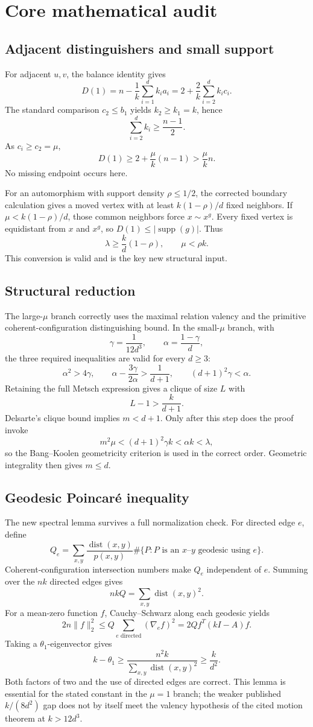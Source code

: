 \documentclass[11pt]{article}
\newcommand{\dist}{\operatorname{dist}}
\newcommand{\gam}{\gamma}
\begin{document}
\section{Core mathematical audit}
\subsection{Adjacent distinguishers and small support}
For adjacent $u,v$, the balance identity gives
\[
 D(1)=n-\frac1k\sum_{i=1}^d k_i a_i
     =2+\frac2k\sum_{i=2}^d k_i c_i.
\]
The standard comparison $c_2\le b_1$ yields $k_2\ge k_1=k$, hence
\[
 \sum_{i=2}^d k_i\ge\frac{n-1}{2}.
\]
As $c_i\ge c_2=\mu$,
\[
 D(1)\ge2+\frac{\mu}{k}(n-1)>\frac{\mu}{k}n.
\]
No missing endpoint occurs here.

For an automorphism with support density $\rho\le1/2$, the corrected boundary calculation gives a moved vertex with at least $k(1-\rho)/d$ fixed neighbors.  If $\mu<k(1-\rho)/d$, those common neighbors force $x\sim x^g$.  Every fixed vertex is equidistant from $x$ and $x^g$, so $D(1)\le|\operatorname{supp}(g)|$.  Thus
\[
 \lambda\ge\frac{k}{d}(1-\rho),
 \qquad
 \mu<\rho k.
\]
This conversion is valid and is the key new structural input.

\subsection{Structural reduction}
The large-$\mu$ branch correctly uses the maximal relation valency and the primitive coherent-configuration distinguishing bound.  In the small-$\mu$ branch, with
\[
 \gam=\frac1{12d^3},\qquad \alpha=\frac{1-\gam}{d},
\]
the three required inequalities are valid for every $d\ge3$:
\[
 \alpha^2>4\gam,
 \qquad
 \alpha-\frac{3\gam}{2\alpha}>\frac1{d+1},
 \qquad
 (d+1)^2\gam<\alpha.
\]
Retaining the full Metsch expression gives a clique of size $L$ with
\[
 L-1>\frac{k}{d+1}.
\]
Delsarte's clique bound implies $m<d+1$.  Only after this step does the proof invoke
\[
 m^2\mu<(d+1)^2\gam k<\alpha k<\lambda,
\]
so the Bang--Koolen geometricity criterion is used in the correct order.  Geometric integrality then gives $m\le d$.

\subsection{Geodesic Poincar\'e inequality}
The new spectral lemma survives a full normalization check.  For directed edge $e$, define
\[
 Q_e=\sum_{x,y}\frac{\dist(x,y)}{p(x,y)}
 \#\{P:P\text{ is an }x\text{--}y\text{ geodesic using }e\}.
\]
Coherent-configuration intersection numbers make $Q_e$ independent of $e$.  Summing over the $nk$ directed edges gives
\[
 nkQ=\sum_{x,y}\dist(x,y)^2.
\]
For a mean-zero function $f$, Cauchy--Schwarz along each geodesic yields
\[
 2n\|f\|_2^2
 \le Q\sum_{e\text{ directed}}(\nabla_e f)^2
 =2Q f^T(kI-A)f.
\]
Taking a $\theta_1$-eigenvector gives
\[
 k-\theta_1\ge \frac{n^2k}{\sum_{x,y}\dist(x,y)^2}\ge\frac{k}{d^2}.
\]
Both factors of two and the use of directed edges are correct.  This lemma is essential for the stated constant in the $\mu=1$ branch; the weaker published $k/(8d^2)$ gap does not by itself meet the valency hypothesis of the cited motion theorem at $k>12d^3$.
\end{document}
